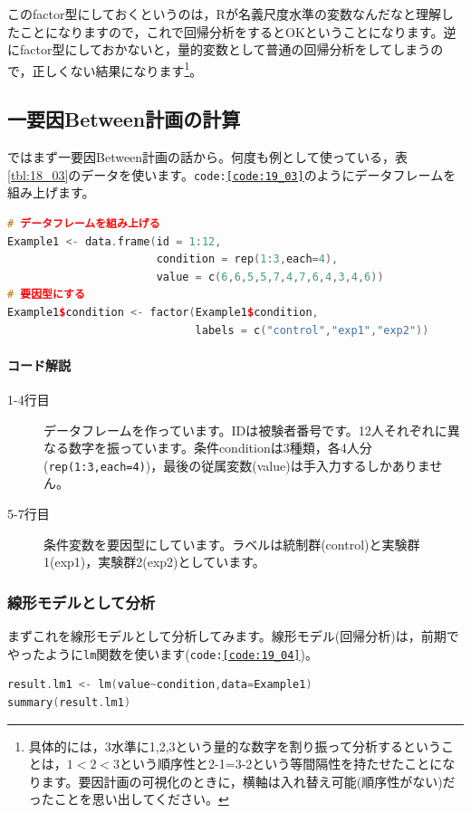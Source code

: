 \documentclass{ltjbook}
\begin{document}
このfactor型にしておくというのは，Rが名義尺度水準の変数なんだなと理解したことになりますので，これで回帰分析をするとOKということになります。逆にfactor型にしておかないと，量的変数として普通の回帰分析をしてしまうので，正しくない結果になります\footnote{具体的には，3水準に1,2,3という量的な数字を割り振って分析するということは，$1<2<3$という順序性と2-1=3-2という等間隔性を持たせたことになります。要因計画の可視化のときに，横軸は入れ替え可能(順序性がない)だったことを思い出してください。}。

\subsection{一要因Between計画の計算}
ではまず一要因Between計画の話から。何度も例として使っている，表\ref{tbl:18_03}のデータを使います。\texttt{code:\ref{code:19_03}}のようにデータフレームを組み上げます。

\begin{lstlisting}[language=c++,label={code:19_03},caption={データの準備}]
# データフレームを組み上げる
Example1 <- data.frame(id = 1:12,
                       condition = rep(1:3,each=4),
                       value = c(6,6,5,5,7,4,7,6,4,3,4,6))
# 要因型にする
Example1$condition <- factor(Example1$condition,
                             labels = c("control","exp1","exp2"))
\end{lstlisting}

\paragraph{コード解説}
\begin{description}
	\item[1-4行目] データフレームを作っています。IDは被験者番号です。12人それぞれに異なる数字を振っています。条件conditionは3種類，各4人分(\texttt{rep(1:3,each=4)})，最後の従属変数(value)は手入力するしかありません。
	\item[5-7行目] 条件変数を要因型にしています。ラベルは統制群(control)と実験群1(exp1)，実験群2(exp2)としています。
\end{description}

\subsubsection{線形モデルとして分析}
まずこれを線形モデルとして分析してみます。線形モデル(回帰分析)は，前期でやったように\texttt{lm}関数を使います(\texttt{code:\ref{code:19_04}})。

\begin{lstlisting}[language=c++,label={code:19_04},caption={lm関数で分析}]
result.lm1 <- lm(value~condition,data=Example1)
summary(result.lm1)
\end{lstlisting}
\end{document}
